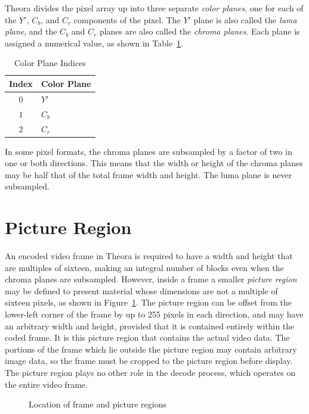 \documentclass[11pt,letterpaper]{book}
\newcommand{\term}[1]{{\em #1}}
\numberwithin{equation}{chapter}
\numberwithin{figure}{chapter}
\numberwithin{table}{chapter}
\begin{document}
Theora divides the pixel array up into three separate \term{color planes}, one
 for each of the $Y'$, $C_b$, and $C_r$ components of the pixel.
The $Y'$ plane is also called the \term{luma plane}, and the $C_b$ and $C_r$
 planes are also called the \term{chroma planes}.
Each plane is assigned a numerical value, as shown in
 Table~\ref{tab:color-planes}.

\begin{table}[htb]
\begin{center}
\begin{tabular}{cl}\toprule
Index & Color Plane \\\midrule
$0$   & $Y'$        \\
$1$   & $C_b$       \\
$2$   & $C_r$       \\
\bottomrule\end{tabular}
\end{center}
\caption{Color Plane Indices}
\label{tab:color-planes}
\end{table}

In some pixel formats, the chroma planes are subsampled by a factor of two
 in one or both directions.
This means that the width or height of the chroma planes may be half that of
 the total frame width and height.
The luma plane is never subsampled.

\section{Picture Region}

An encoded video frame in Theora is required to have a width and height that
 are multiples of sixteen, making an integral number of blocks even when the
 chroma planes are subsampled.
However, inside a frame a smaller \term{picture region} may be defined
 to present material whose dimensions are not a multiple of sixteen pixels, as
 shown in Figure~\ref{fig:pic-frame}.
The picture region can be offset from the lower-left corner of the frame by up
 to 255 pixels in each direction, and may have an arbitrary width and height,
 provided that it is contained entirely within the coded frame.
It is this picture region that contains the actual video data.
The portions of the frame which lie outside the picture region may contain
 arbitrary image data, so the frame must be cropped to the picture region
 before display.
The picture region plays no other role in the decode process, which operates on
 the entire video frame.

\begin{figure}[htb]
\begin{center}

\end{center}
\caption{Location of frame and picture regions}
\label{fig:pic-frame}
\end{figure}
\end{document}
